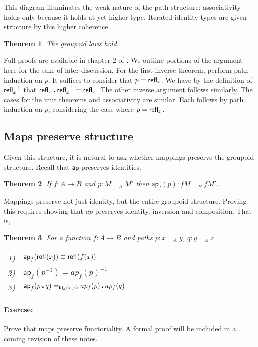 \documentclass[12pt]{article}
\newcommand{\Ap}{\mathsf{ap}}
\newtheorem{thm}{Theorem}
\begin{document}
This diagram illuminates the weak nature of the path structure: 
associativity holds only because it holds at yet higher type.
Iterated identity types are given structure by this higher coherence.

\begin{thm}
The groupoid laws hold.
\end{thm}

Full proofs are available in chapter 2 of \cite{HoTTBook2013}. We outline
portions of the argument here for the sake of later discussion.
For the first inverse theorem, perform path induction on $p$.  It suffices to consider
that $p = \mathsf{refl}_{x}$.  We have by the definition of $\mathsf{refl}_{x}^{-1}$ that
$\mathsf{refl}_{x} \centerdot \mathsf{refl}_{x}^{-1} = \mathsf{refl}_{x}$.  The other inverse argument follows
similarly.  The cases for the unit theorems and associativity are similar.  Each follows
by path induction on $p$, considering the case where $p = \mathsf{refl}_{x}$.

\subsection{Maps preserve structure}

Given this structure, it is natural to ask whether mappings preserve the 
groupoid structure.  Recall that $\Ap$ preserves identities.

\begin{thm}
If $f : A \rightarrow B$ and $p : M =_A M'$ then $\Ap_f(p) : f M =_B f M'$.
\end{thm}

Mappings preserve not just identity, but the entire groupoid structure.
Proving this requires showing that $ap$ preserves identity, inversion
and composition.  That is,

\begin{thm}
For a function $f : A \rightarrow B$ and paths $p : x =_A y$, $q : y =_A z$
\begin{tabular}{l l}
1) & $\Ap_f(\refl{}(x)) \equiv \refl{}(f(x))$ \\
2) & $\Ap_f(p^{-1}) = ap_f(p)^{-1}$ \\
3) & $\Ap_f(p \centerdot q) =_{\Id{a}(x, z)} ap_f(p) \centerdot ap_f(q)$ \\
\end{tabular}
\end{thm}

\paragraph{Exercse:} Prove that maps preserve functoriality.
A formal proof will be included in a coming revision of these notes.
\end{document}
